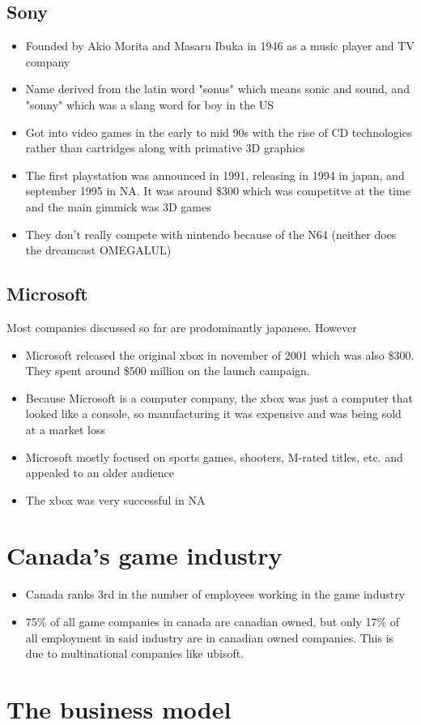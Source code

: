 \documentclass[12pt]{book}
\begin{document}
\subsection{Sony}

\begin{itemize}
    \item Founded by Akio Morita and Masaru Ibuka in 1946 as a music player and TV company
    \item Name derived from the latin word "sonus" which means sonic and sound, and "sonny" which was a slang word for boy in the US
    \item Got into video games in the early to mid 90s with the rise of CD technologies rather than cartridges along with primative 3D graphics
    \item The first playstation was announced in 1991, releasing in 1994 in japan, and september 1995 in NA. It was around \$300 which was competitve at the time and the main gimmick was 3D games
    \item They don't really compete with nintendo because of the N64 (neither does the dreamcast OMEGALUL)
\end{itemize}

\subsection{Microsoft}

Most companies discussed so far are prodominantly japanese. However

\begin{itemize}
    \item Microsoft released the original xbox in november of 2001 which was also \$300. They spent around \$500 million on the launch campaign.
    \item Because Microsoft is a computer company, the xbox was just a computer that looked like a console, so manufacturing it was expensive and was being sold at a market loss
    \item Microsoft mostly focused on sports games, shooters, M-rated titles, etc. and appealed to an older audience
    \item The xbox was very successful in NA
\end{itemize}


\section{Canada's game industry}

\begin{itemize}
    \item Canada ranks 3rd in the number of employees working in the game industry
    \item 75\% of all game companies in canada are canadian owned, but only 17\% of all employment in said industry are in canadian owned companies. This is due to multinational companies like ubisoft.
\end{itemize}

\section{The business model}
\end{document}
